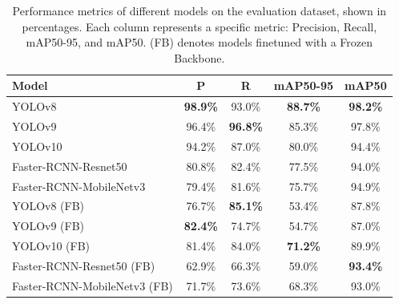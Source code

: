 \documentclass[10pt,twocolumn,letterpaper]{article}
\begin{document}
\begin{table}[thb]
    \scriptsize
    \centering
    \begin{tabular}{lcccc}
        \toprule
        \textbf{Model}               & \textbf{P}      & \textbf{R}      & \textbf{mAP50-95} & \textbf{mAP50}  \\
        \midrule
        YOLOv8                       & \textbf{98.9\%} & 93.0\%          & \textbf{88.7\%}   & \textbf{98.2\%} \\
        YOLOv9                       & 96.4\%          & \textbf{96.8\%} & 85.3\%            & 97.8\%          \\
        YOLOv10                      & 94.2\%          & 87.0\%          & 80.0\%            & 94.4\%          \\
        Faster-RCNN-Resnet50         & 80.8\%          & 82.4\%          & 77.5\%            & 94.0\%          \\
        Faster-RCNN-MobileNetv3      & 79.4\%          & 81.6\%          & 75.7\%            & 94.9\%          \\
        YOLOv8 (FB)                  & 76.7\%          & \textbf{85.1\%} & 53.4\%            & 87.8\%          \\
        YOLOv9 (FB)                  & \textbf{82.4\%} & 74.7\%          & 54.7\%            & 87.0\%          \\
        YOLOv10 (FB)                 & 81.4\%          & 84.0\%          & \textbf{71.2\%}   & 89.9\%          \\
        Faster-RCNN-Resnet50 (FB)    & 62.9\%          & 66.3\%          & 59.0\%            & \textbf{93.4\%} \\
        Faster-RCNN-MobileNetv3 (FB) & 71.7\%          & 73.6\%          & 68.3\%            & 93.0\%          \\
        \bottomrule
    \end{tabular}
    \caption{Performance metrics of different models on the evaluation dataset, shown in percentages. Each column represents a specific metric: Precision, Recall, mAP50-95, and mAP50. (FB) denotes models finetuned with a Frozen Backbone.}
    \label{tab:metrics-results}
\end{table}
\end{document}
